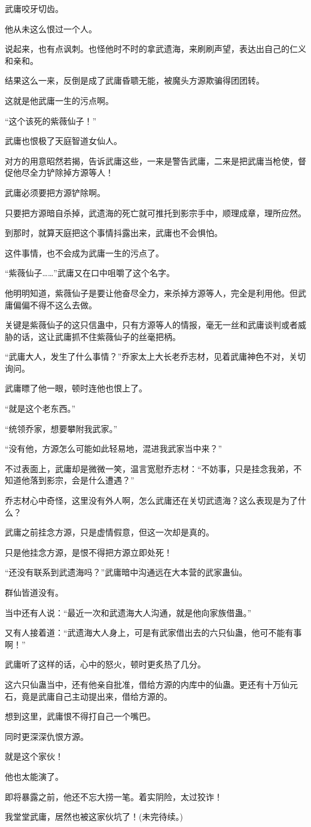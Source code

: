 \begin{this_body}
武庸咬牙切齿。

他从未这么恨过一个人。

说起来，也有点讽刺。也怪他时不时的拿武遗海，来刷刷声望，表达出自己的仁义和亲和。

结果这么一来，反倒是成了武庸昏聩无能，被魔头方源欺骗得团团转。

这就是他武庸一生的污点啊。

“这个该死的紫薇仙子！”

武庸也恨极了天庭智道女仙人。

对方的用意昭然若揭，告诉武庸这些，一来是警告武庸，二来是把武庸当枪使，督促他尽全力铲除掉方源等人！

武庸必须要把方源铲除啊。

只要把方源暗自杀掉，武遗海的死亡就可推托到影宗手中，顺理成章，理所应然。

到那时，就算天庭把这个事情抖露出来，武庸也不会惧怕。

这件事情，也不会成为武庸一生的污点了。

“紫薇仙子……”武庸又在口中咀嚼了这个名字。

他明明知道，紫薇仙子是要让他奋尽全力，来杀掉方源等人，完全是利用他。但武庸偏偏不得不这么去做。

关键是紫薇仙子的这只信蛊中，只有方源等人的情报，毫无一丝和武庸谈判或者威胁的话，这让武庸抓不住紫薇仙子的丝毫把柄。

“武庸大人，发生了什么事情？”乔家太上大长老乔志材，见着武庸神色不对，关切询问。

武庸瞟了他一眼，顿时连他也恨上了。

“就是这个老东西。”

“统领乔家，想要攀附我武家。”

“没有他，方源怎么可能如此轻易地，混进我武家当中来？”

不过表面上，武庸却是微微一笑，温言宽慰乔志材：“不妨事，只是挂念我弟，不知道他落到影宗，会是什么遭遇？”

乔志材心中奇怪，这里没有外人啊，怎么武庸还在关切武遗海？这么表现是为了什么？

武庸之前挂念方源，只是虚情假意，但这一次却是真的。

只是他挂念方源，是恨不得把方源立即处死！

“还没有联系到武遗海吗？”武庸暗中沟通远在大本营的武家蛊仙。

群仙皆道没有。

当中还有人说：“最近一次和武遗海大人沟通，就是他向家族借蛊。”

又有人接着道：“武遗海大人身上，可是有武家借出去的六只仙蛊，他可不能有事啊！”

武庸听了这样的话，心中的怒火，顿时更炙热了几分。

这六只仙蛊当中，还有他亲自批准，借给方源的内库中的仙蛊。更还有十万仙元石，竟是武庸自己主动提出来，借给方源的。

想到这里，武庸恨不得打自己一个嘴巴。

同时更深深仇恨方源。

就是这个家伙！

他也太能演了。

即将暴露之前，他还不忘大捞一笔。着实阴险，太过狡诈！

我堂堂武庸，居然也被这家伙坑了！(未完待续。)

\end{this_body}

